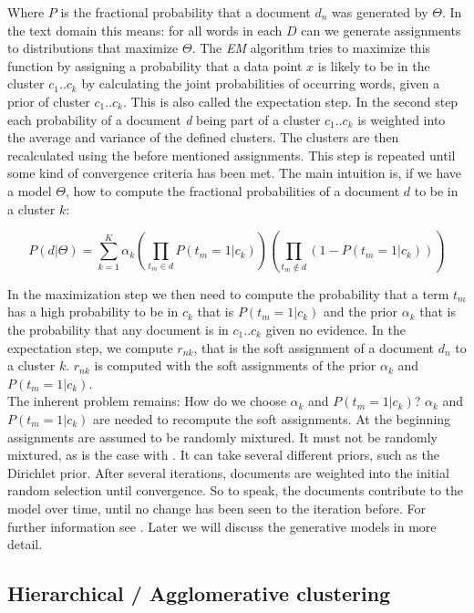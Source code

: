     Where $P$ is the fractional probability that a document $d_n$ was generated by $\Theta$. In the text domain this means: for all words in each $D$ can we generate assignments to distributions that maximize $\Theta$.
    The \emph{EM} algorithm tries to maximize this function by assigning a probability that a data point $x$ is likely to be in the cluster $c_1..c_k$ by calculating the joint probabilities of occurring words, given a prior of cluster $c_1..c_k$. This is also called the expectation step. In the second step each probability of a document \emph{d} being part of a cluster $c_1..c_k$ is weighted into the average and variance of the defined clusters. The clusters are then recalculated using the before mentioned assignments. This step is repeated until some kind of convergence criteria has been met. The main intuition is, if we have a model $\Theta$, how to compute the fractional probabilities of a document $d$ to be in a cluster $k$:

      \begin{equation}
        P(d|\Theta) = \sum_{k=1}^{K}\alpha_k\left ( \prod_{t_m \in d} P(t_m = 1|c_k) \right ) \left ( \prod_{t_m \not\in d} (1 - P(t_m = 1|c_k)) \right )
      \end{equation}

    In the maximization step we then need to compute the probability that a term $t_m$ has a high probability to be in $c_k$ that is $P(t_m = 1|c_k)$ and the prior $\alpha_k$ that is the probability that any document is in $c_1..c_k$ given no evidence. In the expectation step, we compute $r_{nk}$, that is the soft assignment of a document $d_n$ to a cluster $k$. $r_{nk}$ is computed with the soft assignments of the prior $\alpha_k$ and $P(t_m = 1|c_k)$.\\
    The inherent problem remains: How do we choose $\alpha_k$ and $P(t_m = 1|c_k)$? $\alpha_k$ and $P(t_m = 1|c_k)$ are needed to recompute the soft assignments. At the beginning assignments are assumed to be randomly mixtured. It must not be randomly mixtured, as is the case with \kmeans{}. It can take several different priors, such as the Dirichlet prior. After several iterations, documents are weighted into the initial random selection until convergence. So to speak, the documents contribute to the model over time, until no change has been seen to the iteration before. For further information see \cite{IRBookStanford2008}. Later we will discuss the generative models in more detail.

  \subsection{Hierarchical / Agglomerative clustering}
  \label{sec:hierachical}

